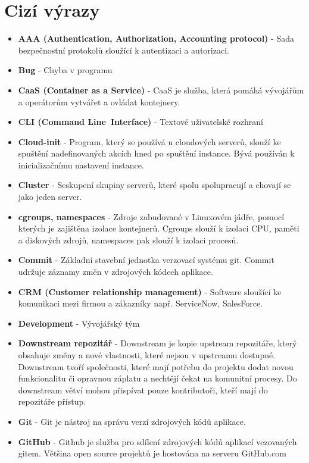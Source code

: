 \appendix
{}

\chapter{Cizí výrazy}
\begin{itemize}
\item \textbf{AAA (Authentication, Authorization, Accounting protocol)} - Sada bezpečnostní protokolů sloužící k autentizaci a autorizaci.
\item \textbf{Bug} - Chyba v programu
\item \textbf{CaaS (Container as a Service)} - CaaS je služba, která pomáhá vývojářům a operátorům vytvářet a ovládat kontejnery. 
\item \textbf{CLI (Command Line Interface)} - Textové uživatelské rozhraní
\item \textbf{Cloud-init} - Program, který se používá u cloudových serverů, slouží ke spuštění nadefinovaných akcích hned po spuštění instance. Bývá používán k inicializačnímu nastavení instance. 
\item \textbf{Cluster} - Seskupení skupiny serverů, které spolu spolupracují a chovají se jako jeden server.
\item \textbf{cgroups, namespaces} - Zdroje zabudované v Linuxovém jádře, pomocí kterých je zajištěna izolace kontejnerů. Cgroups slouží k izolaci CPU, paměti a diskových zdrojů, namespaces pak slouží k izolaci procesů. 
\item \textbf{Commit} - Základní stavební jednotka verzovací systému git. Commit udržuje záznamy změn v zdrojových kódech aplikace. 
\item \textbf{CRM (Customer relationship management)} - Software sloužící ke komunikaci mezi firmou a zákazníky např. ServiceNow, SalesForce.
\item \textbf{Development} - Vývojářský tým
\item \textbf{Downstream repozitář} - Downstream je kopie upstream repozitáře, který obsahuje změny a nové vlastnosti, které nejsou v upstreamu dostupné. Downstream tvoří společnosti, které mají potřebu do projektu dodat novou funkcionalitu či opravnou záplatu a nechtějí čekat na komunitní procesy. Do downstream větví mohou přispívat pouze kontributoři, kteří mají do repozitáře přístup.
\item \textbf{Git} - Git je nástroj na správu verzí zdrojových kódů aplikace.
\item \textbf{GitHub} - Github je služba pro sdílení zdrojových kódů aplikací vezovaných gitem. Většina open source projektů je hostována na serveru GitHub.com 

\end{itemize}
